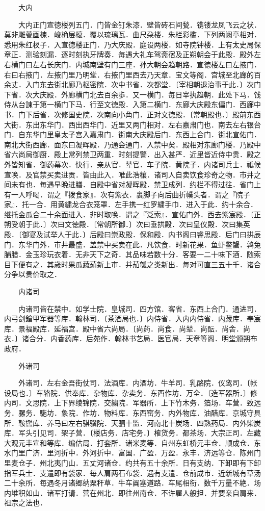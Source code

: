 　　大内

　　大内正门宣徳楼列五门．门皆金钉朱漆．壁皆砖石间甃．镌镂龙凤飞云之状．莫非雕甍画楝．峻桷层榱．覆以琉璃瓦．曲尺朶楼．朱栏彩槛．下列两阙亭相对．悉用朱红杈子．入宣徳楼正门．乃大庆殿．庭设两楼．如寺院钟楼．上有太史局保章正．测验刻漏．逐时刻执牙牌奏．毎遇大礼车驾斋宿及正朔朝会于此殿．殿外左右横门曰左右长庆门．内城南壁有门三座．孙大朝会趋朝路．宣徳楼左曰左掖门．右曰右掖门．左掖门里乃明堂．右掖门里西去乃天章．宝文等阁．宫城至北廊的百余丈．入门东去街北廊乃枢密院．次中书省．次都堂．〔宰相朝退治事于此．〕次门下省．次大庆殿．外廊横门北去百余歩．又一横门．毎日宰执趋朝．此处下马．饯侍从台諌于第一横门下马．行至文徳殿．入第二横门．东廊大庆殿东偏门．西廊中书．门下后省．次修国史院．次南向小角门．正对文徳殿．〔常朝殿也．〕殿前东西大街．东出东华门．西出西华门．近里又两门相对．左右嘉肃门也．南去左右银台门．自东华门里皇太子宫入嘉肃门．街南大庆殿后门．东西上合门．街北宣佑门．南北大街西廊．面东曰凝晖殿．乃通会通门．入禁中矣．殿相对东廊门楼．乃殿中省六尚局御厨．殿上常列禁卫两重．时刻提警．出入甚严．近里皆近侍中贵．殿之外皆知省．御药幕次．快行．亲从官．辇官．车子院．黄院子．内诸司兵士．祗候宣唤．及官禁买卖进贡．皆由此入．唯此浩穰．诸司人自卖饮食珍奇之物．市井之间未有也．毎遇早晩进膳．自殿中省对凝晖殿．禁卫成列．约栏不得过往．省门上有一人呼喝．谓之『拨食家』．次有紫衣．裹脚子向后曲折幞头者．谓之『院子家』．托一合．用黄繍龙合衣笼罩．左手携一红罗繍手巾．进入于此．约十余合．继托金瓜合二十余面进入．非时取唤．谓之『泛索』．宣佑门外．西去紫宸殿．〔正朔受朝于此．〕次曰文徳殿．〔常朝所御．〕次曰垂拱殿．次曰皇仪殿．次曰集英殿．〔御宴及试举人于此．〕后殿曰崇政殿．保和殿．内书阁曰睿思殿．后门曰拱辰门．东华门外．市井最盛．盖禁中买卖在此．凡饮食．时新花果．鱼虾鳖蟹．鹑兔脯腊．金玉珍玩衣着．无非天下之奇．其品味若数十分．客要一二十味下酒．随索目下便有之．其歳时果瓜蔬茹新上市．并茄瓠之类新出．毎对可直三五十千．诸合分争以贵价取之．

　　内诸司

　　内诸司皆在禁中．如学士院．皇城司．四方馆．客省．东西上合门．通进司．内弓剑鎗甲军器等库．翰林司．〔茶酒局也．〕内侍省．入内内侍省．内藏库．奉宸库．景福殿库．延福宫．殿中省六尚局．〔尚药．尚食．尚辇．尚酝．尚舎．尚衣．〕诸合分．内香药库．后苑作．翰林书艺局．医官局．天章等阁．明堂颁朔布政府．

　　外诸司

　　外诸司．左右金吾街仗司．法酒库．内酒坊．牛羊司．乳酪院．仪鸾司．〔帐设局也．〕车辂院．供奉库．杂物库．杂卖务．东西作坊．万全．〔造军器所．〕修内司．文思院．上下界绫锦院．交繍院．军器所．上下竹木务．箔场．车营．致远务．骡务．駞坊．象院．作坊．物料库．东西窑务．内外物库．油醋库．京城守具所．鞍辔库．养马曰左右骐骥院．天驷十监．河南北十炭场．四熟药局．内外柴炭库．军头引见司．架子营．〔楼店务．店宅务．〕榷货务．都茶场．大宗正司．左藏大观元丰宣和等库．编估局．打套所．诸米麦等．自州东虹桥元丰仓．顺成仓．东水门里广济．里河折中．外河折中．富国．广盈．万盈．永丰．济远等仓．陈州门里麦仓子．州北夷门山．五丈河诸仓．约共有五十余所．日有支纳．下卸即有下卸指军兵士．支遣即有袋家．毎人肩两石布袋．遇有支遣．仓前成市．近新城有草汤二十余所．毎遇冬月诸郷纳粟秆草．牛车阗塞道路．车尾相衔．数千万量不絶．场内堆积如山．诸军打请．营在州北．即往州南仓．不许雇人般担．并要亲自肩来．祖宗之法也．

